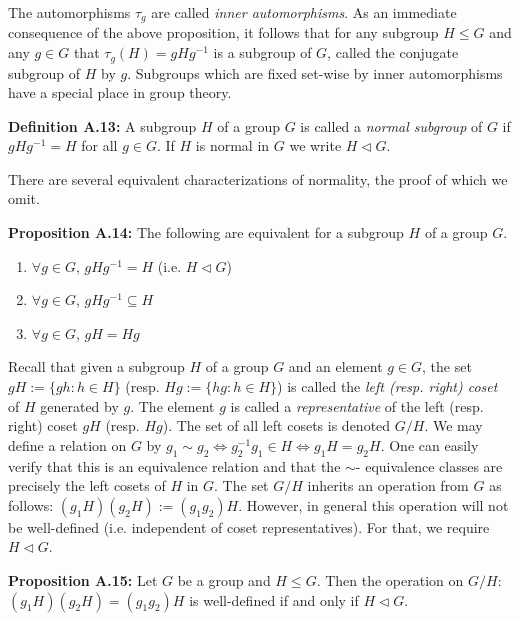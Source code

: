 \documentclass[12pt]{article}
\newcommand{\vs}{\vskip10pt}
\begin{document}
	The automorphisms $\tau_g$ are called \textit{inner automorphisms}. As an immediate consequence of the above proposition, it follows that for any subgroup $H \leq G$ and any $g \in G$ that $\tau_g(H) = gHg^{-1}$ is a subgroup of $G$, called the conjugate subgroup of $H$ by $g$. Subgroups which are fixed set-wise by inner automorphisms have a special place in group theory. 
	
	\vs 
	
	\textbf{Definition A.13: } A subgroup $H$ of a group $G$ is called a \textit{normal subgroup} of $G$ if $gHg^{-1} = H$ for all $g \in G$. If $H$ is normal in $G$ we write $H \triangleleft G$.
	
	\vs 
	
	There are several equivalent characterizations of normality, the proof of which we omit. 
	
	\vs 
	
	\textbf{Proposition A.14: } The following are equivalent for a subgroup $H$ of a group $G$. 
	
	\begin{enumerate}[label = (\alph*)]
		\item $\forall g \in G$, $gHg^{-1} = H$ (i.e. $H \triangleleft G$)
		\item $\forall g \in G$, $gHg^{-1} \subseteq H$
		\item $\forall g \in G$, $gH = Hg$
	\end{enumerate}
	
	\vs 
	
	Recall that given a subgroup $H$ of a group $G$ and an element $g \in G$, the set $gH := \{gh: h \in H\}$ (resp. $Hg := \{hg: h \in H\}$) is called the \textit{left (resp. right) coset} of $H$ generated by $g$. The element $g$ is called a \textit{representative} of the left (resp. right) coset $gH$ (resp. $Hg$). The set of all left cosets is denoted $G/H$. We may define a relation on $G$ by $g_1 \sim g_2 \iff g_2^{-1} g_1 \in H \iff g_1 H = g_2 H$. One can easily verify that this is an equivalence relation and that the $\sim$- equivalence classes are precisely the left cosets of $H$ in $G$. The set $G/H$ inherits an operation from $G$ as follows: $(g_1H)(g_2H) := (g_1 g_2)H$. However, in general this operation will not be well-defined (i.e. independent of coset representatives). For that, we require $H \triangleleft G$. 
	
	\vs
	
	\textbf{Proposition A.15: } Let $G$ be a group and $H \leq G$. Then the operation on $G/H$: $(g_1 H) (g_2 H) = (g_1 g_2) H$ is well-defined if and only if $H \triangleleft G$. 
	
\end{document}
